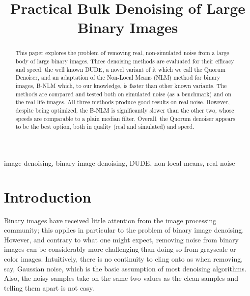 \documentclass{article}
\title{Practical Bulk Denoising of Large Binary Images}
\begin{document}
\maketitle

\begin{abstract}
This paper explores the problem of removing real, non-simulated noise from a large body of large binary images. Three denoising methods are evaluated for their efficacy and speed: the well known DUDE, a novel variant of it which we call the Quorum Denoiser, and an adaptation of the Non-Local Means (NLM) method for binary images, B-NLM which, to our knowledge, is faster than other known variants. The methods are compared and tested both on simulated noise (as a benchmark) and on the real life images. All three methods produce good results on real noise. However, despite being optimized, the B-NLM is significantly slower than the other two, whose speeds are comparable to a plain median filter. Overall, the Quorum denoiser appears to be the best option, both in quality (real and simulated) and speed.
\end{abstract}

\begin{keywords}
image denoising, binary image denoising, DUDE, non-local means, real noise
\end{keywords}

%
\section{Introduction}
%
\label{sec:intro}
Binary images have received little attention from the image processing community; this applies in particular to the problem of binary image denoising. However, and contrary to what one might expect, removing noise from binary images can be considerably more challenging than doing so from grayscale or color images. Intuitively, there is no continuity to cling onto as when removing, say, Gaussian noise, which is the basic assumption of most denoising algorithms. Also, the noisy samples take on the same two values as the clean samples and  telling them apart is not easy. \\
\end{document}
